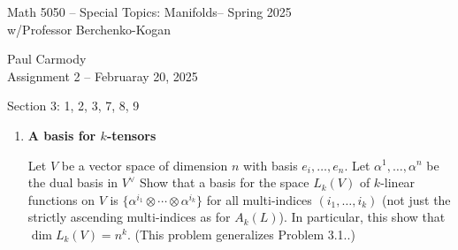 \documentclass[10pt,a4paper]{report}
\newcommand{\CLASSNAME}{Math 5050 -- Special Topics: Manifolds}
\newcommand{\STUDENTNAME}{Paul Carmody}
\newcommand{\ASSIGNMENT}{Assignment 2 }
\newcommand{\DUEDATE}{Februaray 20, 2025}
\newcommand{\SEMESTER}{Spring 2025}
\begin{document}
\begin{center}
	\Large{\CLASSNAME -- \SEMESTER} \\
	\large{ w/Professor Berchenko-Kogan}
\end{center}
\begin{center}
	\STUDENTNAME \\
	\ASSIGNMENT -- \DUEDATE\\
\end{center} 

\noindent Section 3: 1, 2, 3, 7, 8, 9\\

\begin{enumerate}[label=3.\arabic*.]
		
	\item \textbf{A basis for $k$-tensors}
		
	Let $V$ be a vector space of dimension $n$ with basis $e_i,\dots,e_n$.  Let $\alpha^1,\dots, \alpha^n$ be the dual basis in $V^\vee$  Show that a basis for the space $L_k(V)$ of $k$-linear functions on $V$ is $\{\alpha^{i_1}\otimes \cdots \otimes \alpha^{i_k}\}$ for all multi-indices $(i_1,\dots, i_k)$ (not just the strictly ascending multi-indices as for $A_k(L)$).  In particular, this show that $\dim L_k(V) = n^k$.  (This problem generalizes Problem 3.1..)
	

\end{enumerate}
\end{document}
